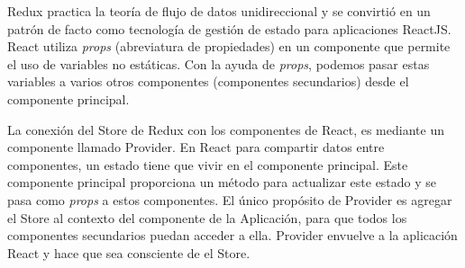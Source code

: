Redux practica la teoría de flujo de datos unidireccional y se convirtió en un patrón de facto como tecnología de gestión de estado para aplicaciones ReactJS. React utiliza \textit{props} (abreviatura de propiedades) en un componente que permite el uso de variables no estáticas. Con la ayuda de \textit{props}, podemos pasar estas variables a varios otros componentes (componentes secundarios) desde el componente principal.
\vspace{0.8cm}

La conexión del Store de Redux con los componentes de React, es mediante un componente llamado Provider. En React para compartir datos entre componentes, un estado tiene que vivir en el componente principal. Este componente principal proporciona un método para actualizar este estado y se pasa como \textit{props} a estos componentes. El único propósito de Provider es agregar el Store al contexto del componente de la Aplicación, para que todos los componentes secundarios puedan acceder a ella. Provider envuelve a la aplicación React y hace que sea consciente de el Store.
\vspace{0.8cm}


